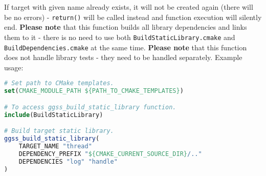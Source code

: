 \noindent
If target with given name already exists, it will not be created again (there will be no errors) - \lstinline{return()} will be called instead and function execution will silently end. \textbf{Please note} that this function builds all library dependencies and links them to it - there is no need to use both \lstinline{BuildStaticLibrary.cmake} and \lstinline{BuildDependencies.cmake} at the same time. \textbf{Please note} that this function does not handle library tests - they need to be handled separately. Example usage:

\begin{lstlisting}[language=CMake]
# Set path to CMake templates.
set(CMAKE_MODULE_PATH ${PATH_TO_CMAKE_TEMPLATES})

# To access ggss_build_static_library function.
include(BuildStaticLibrary)

# Build target static library.
ggss_build_static_library(
    TARGET_NAME "thread"
    DEPENDENCY_PREFIX "${CMAKE_CURRENT_SOURCE_DIR}/.." 
    DEPENDENCIES "log" "handle"
)
\end{lstlisting}





